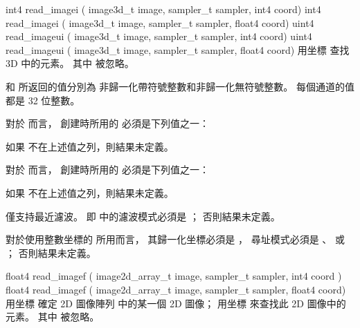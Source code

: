 int4 read_imagei (
	image3d_t image,
	sampler_t sampler,
	int4 coord)
int4 read_imagei (
	image3d_t image,
	sampler_t sampler,
	float4 coord)
uint4 read_imageui (
	image3d_t image,
	sampler_t sampler,
	int4 coord)
uint4 read_imageui (
	image3d_t image,
	sampler_t sampler,
	float4 coord)
\stopbuffer
{}
用坐標  查找
 3D   中的元素。
其中  被忽略。

 和  所返回的值分別為
非歸一化帶符號整數和非歸一化無符號整數。
每個通道的值都是 32 位整數。

對於  而言，
創建時所用的  必須是下列值之一：
\startigBase[indentnext=no]
\item {}
\item {}
\item {}
\stopigBase
如果  不在上述值之列，則結果未定義。

對於  而言，
創建時所用的  必須是下列值之一：
\startigBase[indentnext=no]
\item {}
\item {}
\item {}
\stopigBase
如果  不在上述值之列，則結果未定義。

 僅支持最近濾波。
即  中的濾波模式必須是 ；
否則結果未定義。

對於使用整數坐標的  所用而言，
其歸一化坐標必須是 ，
尋址模式必須是 、 
 或 ；
否則結果未定義。
\stopbuffer

float4 read_imagef (
	image2d_array_t image,
	sampler_t sampler,
	int4 coord )
float4 read_imagef (
	image2d_array_t image,
	sampler_t sampler,
	float4 coord)
\stopbuffer
{}
用坐標  確定 2D 圖像陣列  中的某一個 2D 圖像；
用坐標  來查找此 2D 圖像中的元素。
其中  被忽略。

